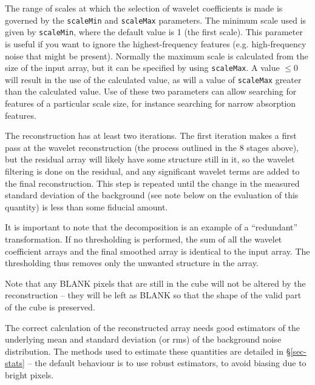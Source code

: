 The range of scales at which the selection of wavelet coefficients is
made is governed by the \texttt{scaleMin} and \texttt{scaleMax}
parameters. The minimum scale used is given by \texttt{scaleMin},
where the default value is 1 (the first scale). This parameter is
useful if you want to ignore the highest-frequency features
(e.g. high-frequency noise that might be present). Normally the
maximum scale is calculated from the size of the input array, but it
can be specified by using \texttt{scaleMax}. A value $\le0$ will
result in the use of the calculated value, as will a value of
\texttt{scaleMax} greater than the calculated value. Use of these two
parameters can allow searching for features of a particular scale
size, for instance searching for narrow absorption features.

The reconstruction has at least two iterations. The first iteration
makes a first pass at the wavelet reconstruction (the process outlined
in the 8 stages above), but the residual array will likely have some
structure still in it, so the wavelet filtering is done on the
residual, and any significant wavelet terms are added to the final
reconstruction. This step is repeated until the change in the measured
standard deviation of the background (see note below on the evaluation
of this quantity) is less than some fiducial amount.

It is important to note that the \atrous decomposition is an example
of a ``redundant'' transformation. If no thresholding is performed,
the sum of all the wavelet coefficient arrays and the final smoothed
array is identical to the input array. The thresholding thus removes
only the unwanted structure in the array.

Note that any BLANK pixels that are still in the cube will not be
altered by the reconstruction -- they will be left as BLANK so that
the shape of the valid part of the cube is preserved.


The correct calculation of the reconstructed array needs good
estimators of the underlying mean and standard deviation (or rms) of
the background noise distribution. The methods used to estimate these
quantities are detailed in \S\ref{sec-stats} -- the default behaviour
is to use robust estimators, to avoid biasing due to bright pixels.


